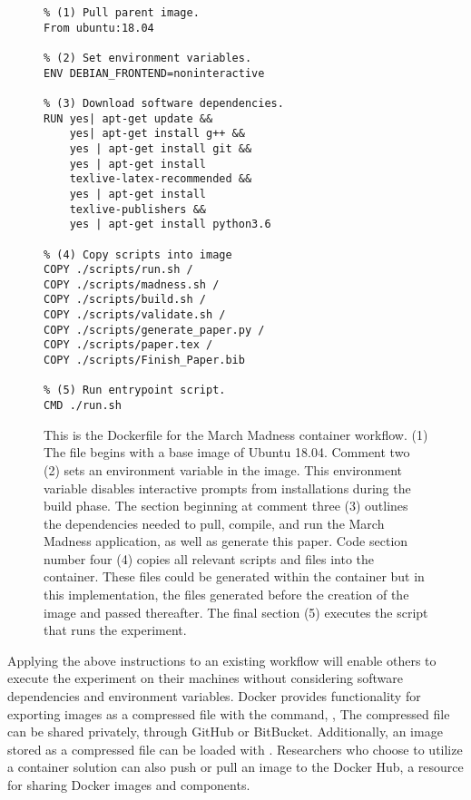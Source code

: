 \documentclass{IEEEtran}
\begin{document}
\begin{figure}[h]
\centering
\begin{mdframed}
\small
\begin{verbatim}
% (1) Pull parent image.
From ubuntu:18.04

% (2) Set environment variables.
ENV DEBIAN_FRONTEND=noninteractive

% (3) Download software dependencies.
RUN yes| apt-get update && 
    yes| apt-get install g++ && 
    yes | apt-get install git && 
    yes | apt-get install 
    texlive-latex-recommended && 
    yes | apt-get install 
    texlive-publishers && 
    yes | apt-get install python3.6
    
% (4) Copy scripts into image
COPY ./scripts/run.sh /
COPY ./scripts/madness.sh /
COPY ./scripts/build.sh /
COPY ./scripts/validate.sh /
COPY ./scripts/generate_paper.py /
COPY ./scripts/paper.tex /
COPY ./scripts/Finish_Paper.bib

% (5) Run entrypoint script.
CMD ./run.sh
\end{verbatim}
\end{mdframed}
\caption{\footnotesize This is the Dockerfile for the March Madness container workflow. (1) The file begins with a base image of Ubuntu 18.04. Comment two (2) sets an environment variable in the image. This environment variable disables interactive prompts from installations during the build phase. The section beginning at comment three (3) outlines the dependencies needed to pull, compile, and run the March Madness application, as well as generate this paper. Code section number four (4) copies all relevant scripts and files into the container. These files could be generated within the container but in this implementation, the files generated before the creation of the image and passed thereafter. The final section (5) executes the script that runs the experiment.
}
\label{fig2}
\end{figure}

Applying the above instructions to an existing workflow will enable others to execute the experiment on their machines without considering software dependencies and environment variables. Docker provides functionality for exporting images as a compressed file with the command, , The compressed file can be shared privately, through GitHub or BitBucket. Additionally, an image stored as a compressed file can be loaded with . Researchers who choose to utilize a container solution can also push or pull an image to the Docker Hub, a resource for sharing Docker images and components.
\end{document}
